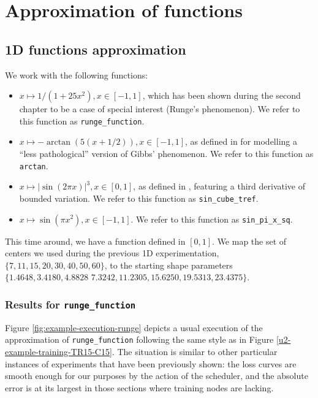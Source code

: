 \documentclass[12pt]{report} %
\begin{document}
\section{Approximation of functions}
\subsection*{1D functions approximation}
We work with the following functions:
\begin{itemize}
  \item $x \mapsto 1/(1+25x^2), x\in[-1,1]$, which has been shown during the second chapter to be a case of special interest (Runge's phenomenon). We refer to this function as \texttt{runge\_function}.
  \item $x \mapsto -\arctan(5(x+1/2)), x\in[-1,1]$, as defined in \cite{fornberg2002observations} for modelling a ``less pathological'' version of Gibbs' phenomenon. We refer to this function as \texttt{arctan}.
  \item $x \mapsto |\sin(2\pi x)|^3, x\in[0,1]$, as defined in \cite{trefethen2000spectral}, featuring a third derivative of bounded variation. We refer to this function as \texttt{sin\_cube\_tref}.
  \item $x\mapsto \sin(\pi x ^2), x \in [-1,1]$. We refer to this function as \texttt{sin\_pi\_x\_sq}.
\end{itemize}


This time around, we have a function defined in $[0,1]$. We map the set of centers we used during the previous 1D experimentation, $\{7,11,15,20,30,40,50,60\}$, to the starting shape parameters $\{1.4648,  3.4180, 4.8828$ $  7.3242, 11.2305, 15.6250,19.5313, 23.4375\}$.



\subsubsection*{Results for \texttt{runge\_function}}

Figure \ref{fig:example-execution-runge} depicts a usual execution of the approximation of \texttt{runge\_function} following the same style as in Figure \ref{u2-example-training-TR15-C15}. The situation is similar to other particular instances of experiments that have been previously shown: the loss curves are smooth enough for our purposes by the action of the scheduler, and the absolute error is at its largest in those sections where training nodes are lacking.
\end{document}
